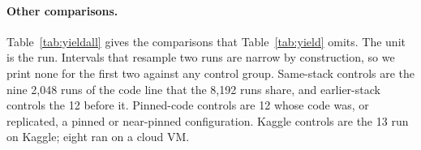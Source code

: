 \begin{table}[!htb]
\caption{The 34 full-length replica runs on this stack, with levels per run, and one run outside them. Used: in the main comparison of Table~\ref{tab:yield}.}\label{tab:runflow}
\centering\footnotesize
\setlength{\tabcolsep}{3pt}
\end{table}

\paragraph{Other comparisons.}
Table~\ref{tab:yieldall} gives the comparisons that Table~\ref{tab:yield} omits. The unit is the run. Intervals that resample two runs are narrow by construction, so we print none for the first two against any control group.
Same-stack controls are the nine 2,048 runs of the code line that the 8,192 runs share, and earlier-stack controls the 12 before it. Pinned-code controls are 12 whose code was, or replicated, a pinned or near-pinned configuration. Kaggle controls are the 13 run on Kaggle; eight ran on a cloud VM. %

